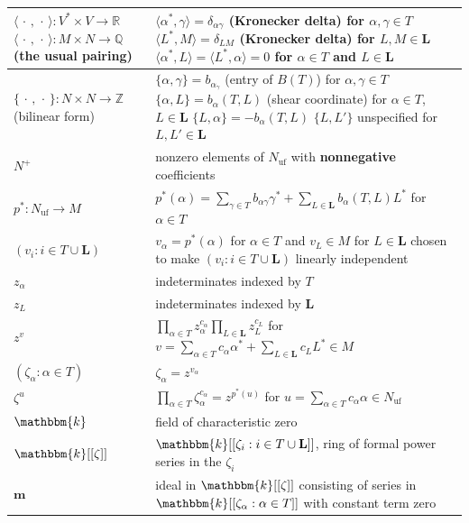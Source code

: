 \documentclass{amsart}
\theoremstyle{definition}
\theoremstyle{remark}
\numberwithin{equation}{section}
\newcommand{\integers}{\mathbb Z}
\newcommand{\rationals}{\mathbb Q}
\newcommand{\reals}{\mathbb R}
\newcommand{\uf}{{\operatorname{uf}}}
\newcommand{\set}[1]{{\lbrace #1 \rbrace}}
\newcommand{\br}[1]{{\langle #1 \rangle}}
\newcommand{\0}{{\mathbf{0}}}
\newcommand{\m}{\mathbf{m}}
\renewcommand{\k}{\mathbbm{k}}
\renewcommand{\L}{\mathbf{L}}
\begin{document}
\begin{longtable}{P{88.5pt}|P{248pt}}
$\br{\,\cdot\,,\,\cdot\,}:V^*\times V\to\reals$\linebreak
$\br{\,\cdot\,,\,\cdot\,}:M\times N\to\rationals$\linebreak
(the usual pairing)& 
$\br{\alpha^*,\gamma}=\delta_{\alpha\gamma}$ (Kronecker delta) for $\alpha,\gamma\in T$\linebreak
$\br{L^*,M}=\delta_{LM}$ (Kronecker delta) for $L,M\in\L$\linebreak
$\br{\alpha^*,L}=\br{L^*,\alpha}=0$ for $\alpha\in T$ and $L\in\L$
\\\hline
$\set{\,\cdot\,,\,\cdot\,}:N\times N\to\integers$\linebreak
(bilinear form)&$\set{\alpha,\gamma}=b_{\alpha_\gamma}$ (entry of $B(T)$) for $\alpha,\gamma\in T$\linebreak
$\set{\alpha,L}=b_\alpha(T,L)$ (shear coordinate) for $\alpha\in T$, $L\in\L$\linebreak
$\set{L,\alpha}=-b_\alpha(T,L)$\linebreak
$\set{L,L'}$ unspecified for $L,L'\in\L$
\\\hline
$N^+$& nonzero elements of $N_\uf$ with \textbf{nonnegative} coefficients\\\hline
$p^*:N_\uf\to M$&
$p^*(\alpha)=\sum_{\gamma\in T}b_{\alpha\gamma}\gamma^*+\sum_{L\in\L}b_\alpha(T,L)L^*$ for $\alpha\in T$\\\hline
$(v_i:i\in T\cup\L)$&$v_\alpha=p^*(\alpha)$ for $\alpha\in T$ and
$v_L\in M$ for $L\in\L$ chosen to make $(v_i:i\in T\cup\L)$ linearly independent
\\\hline
$z_\alpha$&indeterminates indexed by $T$\\\hline
$z_L$&indeterminates indexed by $\L$\\\hline
$z^v$&$\displaystyle\prod_{\alpha\in T}z_\alpha^{c_\alpha}\prod_{L\in\L}z_L^{c_L}$ for $\displaystyle v=\sum_{\alpha\in T}c_\alpha\alpha^*+\sum_{L\in\L}c_LL^*\in M$\\\hline
$(\zeta_\alpha:\alpha\in T)$&$\zeta_\alpha=z^{v_\alpha}$\\\hline
$\zeta^u$&$\displaystyle\prod_{\alpha\in T}\zeta_\alpha^{c_\alpha}=z^{p^*(u)}$ for $\displaystyle u=\sum_{\alpha\in T}c_\alpha\alpha\in N_\uf$\\\hline
$\k$&field of characteristic zero\\\hline
$\k[[\zeta]]$&$\k[[\zeta_i:i\in T\cup\L]]$, ring of formal power series in the $\zeta_i$\\\hline
$\m$&ideal in $\k[[\zeta]]$ consisting of series in $\k[[\zeta_\alpha:\alpha\in T]]$ with constant term zero\\\hline
\end{longtable}
\end{document}
